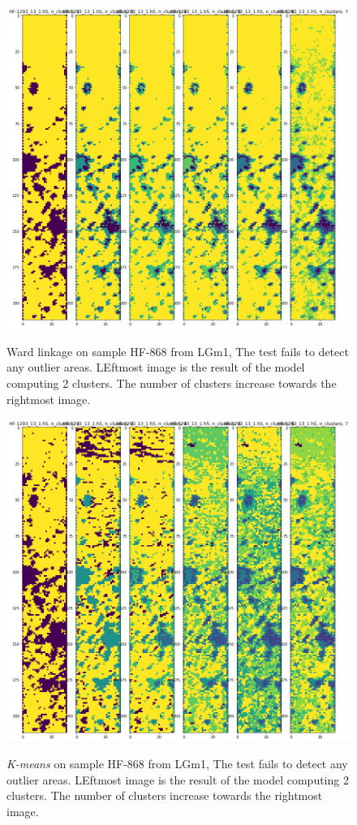 \documentclass[a4paper, 12pt, oneside]{book}
\begin{document}
\begin{appendices}
\begin{figure}[H]
    \centering
{\includegraphics[width=15cm]{images/Ward_linkage/LGm-1/HF-1293_13_1.h5_1.png} }
\caption{Ward linkage on sample HF-868 from LGm1, The test fails to detect any outlier areas. LEftmost image is the result of the model computing 2 clusters. The number of clusters increase towards the rightmost image.\label{fig:SL_HF868}}%

\end{figure}


\begin{figure}[H]

    \centering
{\includegraphics[width=15cm]{images/KMeans_full/LGm-1/HF-1293_13_1.h5_1.png} }
\caption{\textit{K-means} on sample HF-868 from LGm1, The test fails to detect any outlier areas. LEftmost image is the result of the model computing 2 clusters. The number of clusters increase towards the rightmost image.\label{fig:SL_HF868}}%


\end{figure}
\end{appendices}
\end{document}
